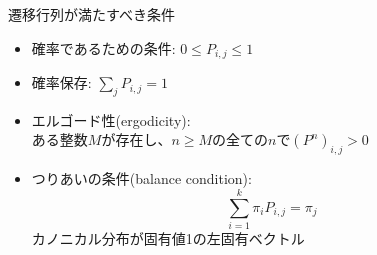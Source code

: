 
\begin{frame}[t,fragile]{遷移行列が満たすべき条件}
  \begin{itemize}
  \item 確率であるための条件: $0 \le P_{i,j} \le 1$
  \item 確率保存: $\sum_j P_{i,j} = 1$
  \item エルゴード性(ergodicity): \\
    ある整数$M$が存在し、$n \ge M$の全ての$n$で$(P^n)_{i,j} > 0$
  \item つりあいの条件(balance condition):
    \[ \sum_{i=1}^k \pi_i P_{i,j} = \pi_j \]
    カノニカル分布が固有値1の左固有ベクトル
  \end{itemize}
\end{frame}
